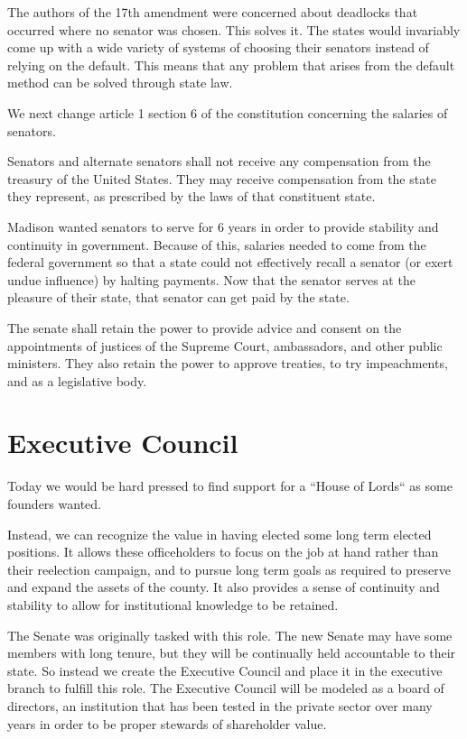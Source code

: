 \documentclass{article}
\begin{document}
The authors of the 17th amendment were concerned about deadlocks that occurred where no senator was chosen. This solves it. The states would invariably come up with a wide variety of systems of choosing their senators instead of relying on the default. This means that any problem that arises from the default method can be solved through state law.

We next change article 1 section 6 of the constitution concerning the salaries of senators.

\begin{quoting}
Senators and alternate senators shall not receive any compensation from the treasury of the United States. They may receive compensation from the state they represent, as prescribed by the laws of that constituent state.
\end{quoting}

Madison wanted senators to serve for 6 years in order to provide stability and continuity in government.\cite{Senate} Because of this, salaries needed to come from the federal government so that a state could not effectively recall a senator (or exert undue influence) by halting payments. Now that the senator serves at the pleasure of their state, that senator can get paid by the state.

\begin{quoting}
The senate shall retain the power to provide advice and consent on the appointments of justices of the Supreme Court, ambassadors, and other public ministers. They also retain the power to approve treaties, to try impeachments, and as a legislative body.
\end{quoting}

\section{Executive Council}

Today we would be hard pressed to find support for a “House of Lords“ as some founders wanted.

Instead, we can recognize the value in having elected some long term elected positions. It allows these officeholders to focus on the job at hand rather than their reelection campaign, and to pursue long term goals as required to preserve and expand the assets of the county. It also provides a sense of continuity and stability to allow for institutional knowledge to be retained.

The Senate was originally tasked with this role. The new Senate may have some members with long tenure, but they will be continually held accountable to their state. So instead we create the Executive Council and place it in the executive branch to fulfill this role. The Executive Council will be modeled as a board of directors, an institution that has been tested in the private sector over many years in order to be proper stewards of shareholder value.
\end{document}
